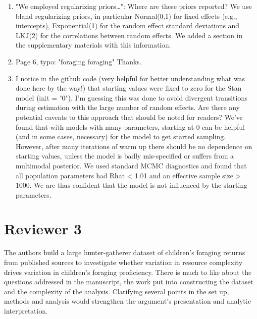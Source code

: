 \documentclass{article}
\newcommand{\rev}[1]{{\color{ForestGreen}#1}}
\begin{document}
\begin{enumerate}
    \item "We employed regularizing priors…": Where are these priors reported? \rev{We use bland regularizing priors, in particular  Normal(0,1) for fixed effects (e.g., intercepts), Exponential(1) for the random effect standard deviations and LKJ(2) for the correlations between random effects. We added a section in the supplementary materials with this information.}
    
    \item Page 6, typo: "foraging foraging" \rev{Thanks.}
    
    \item I notice in the github code (very helpful for better understanding what was done here by the  way!) that starting values were fixed to zero for the Stan model (init = "0"). I'm guessing this was done to avoid divergent transitions during estimation with the large number of random effects.  Are there any potential caveats to this approach that should be noted for readers?
    \rev{We've found that with models with many parameters, starting at 0 can be helpful (and in some cases, necessary) for the model to get started sampling. However, after many iterations of warm up there should be no dependence on starting values, unless the model is badly mis-specified or suffers from a multimodal posterior. We used standard MCMC diagnostics and found that all population parameters had Rhat < 1.01 and an effective sample size > 1000. We are thus confident that the model is not influenced by the starting parameters. }
    
    
\end{enumerate}

\section{Reviewer 3}
 
The authors build a large hunter-gatherer dataset of children’s foraging returns from published sources to investigate whether variation in resource complexity drives variation in children’s foraging proficiency. There is much to like about the questions addressed in the manuscript, the work put into constructing the dataset and the complexity of the analysis. Clarifying several points in the set up, methods and analysis would strengthen the argument’s presentation and analytic interpretation.
\end{document}
